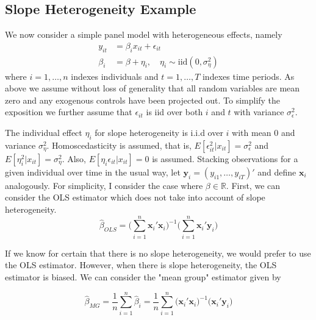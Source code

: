 \subsection{Slope Heterogeneity Example}

\label{sec:slopeHet}
We now consider a simple panel model with heterogeneous effects, namely
	\begin{align}
				y_{it} &= \beta_i x_{it} + \epsilon_{it}\\
        \beta_i &= \beta + \eta_i, \quad \eta_i \sim \mbox{iid} (0, \sigma_\eta^2)
	\end{align}
where $i = 1, \hdots, n$ indexes individuals and $t=1, \hdots, T$ indexes time periods.
As above we assume without loss of generality that all random variables are mean zero and any exogenous controls have been projected out.
To simplify the exposition we further assume that $\epsilon_{it}$ is iid over both $i$ and $t$ with variance $\sigma_\epsilon^2$. 

The individual effect $\eta_i$ for slope heterogeneity is i.i.d over $i$ with mean 0 and variance $\sigma_\eta^2$. Homoscedasticity is assumed, that is, $E[\epsilon_{it}^2 | x_{it}] = \sigma_\epsilon^2$ and $E[\eta_i^2 | x_{it}] = \sigma_\eta^2$. Also, $E[\eta_i \epsilon_{it} | x_{it}] = 0$ is assumed. Stacking observations for a given individual over time in the usual way, let $\mathbf{y}_i = (y_{i1}, \ldots, y_{iT})'$ and define $\mathbf{x}_i$ analogously. For simplicity, I consider the case where $\beta \in \mathbb{R}$. First, we can consider the OLS estimator which does not take into account of slope heterogeneity. 
	\begin{equation}
\widehat{\beta}_{OLS} = \bigg(\sum_{i=1}^{n} \mathbf{x}_i'  \mathbf{x}_i\bigg)^{-1}\bigg(\sum_{i=1}^{n} \mathbf{x}_i' \mathbf{y}_i   \bigg)	
	\end{equation}
	
If we know for certain that there is no slope heterogeneity, we would prefer to use the OLS estimator. However, when there is slope heterogeneity, the OLS estimator is biased. We can consider the "mean group" estimator given by 


	\begin{equation}
\widehat{\beta}_{MG}  = \frac{1}{n}\sum_{i=1}^n \widehat{\beta}_i 
= \frac{1}{n} \sum_{i=1}^n \bigg( \mathbf{x}_i'  \mathbf{x}_i\bigg)^{-1}\bigg( \mathbf{x}_i'  \mathbf{y}_i   \bigg)
\end{equation}

